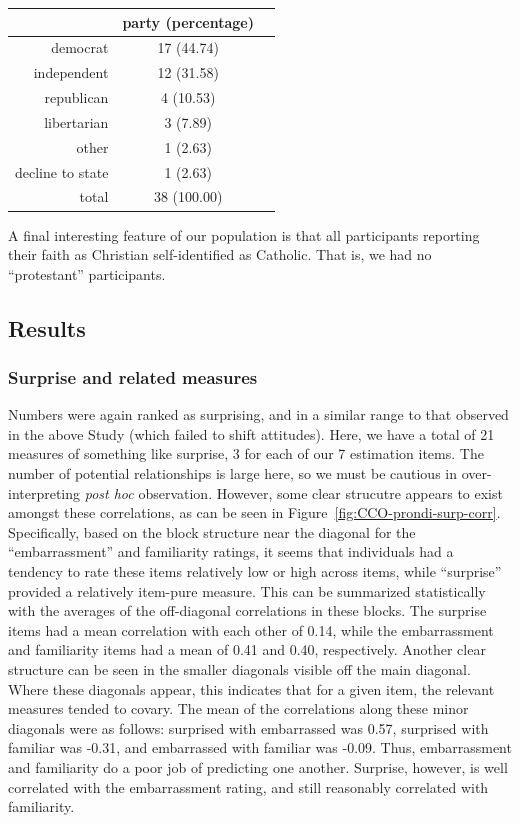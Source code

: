 \begin{table}[ht]
\centering
\begin{tabular}{rcc}
  \toprule
      & party (percentage) \\ 
  \midrule
  democrat &  17 (44.74) \\ 
  independent &  12 (31.58) \\ 
  republican &   4 (10.53) \\ 
  libertarian &   3 (7.89) \\ 
  other &   1 (2.63) \\ 
  decline to state &   1 (2.63) \\ 
  \midrule
  total &  38 (100.00) \\ 
   \bottomrule
\end{tabular}
\end{table}

A final interesting feature of our population is that all participants reporting
their faith as Christian self-identified as Catholic. That is, we had no
“protestant” participants.

\subsection{Results}

\subsubsection{Surprise and related measures}

Numbers were again ranked as surprising, and in a similar range to that observed
in the above Study (which failed to shift attitudes). Here, we have a total of
21 measures of something like surprise, 3 for each of our 7 estimation items.
The number of potential relationships is large here, so we must be cautious in
over-interpreting \emph{post hoc} observation. However, some clear strucutre
appears to exist amongst these correlations, as can be seen in
Figure~\ref{fig:CCO-prondi-surp-corr}. Specifically, based on the block
structure near the diagonal for the “embarrassment” and familiarity ratings, it
seems that individuals had a tendency to rate these items relatively low or high
across items, while “surprise” provided a relatively item-pure measure. This can
be summarized statistically with the averages of the off-diagonal correlations
in these blocks. The surprise items had a mean correlation with each other of
0.14, while the embarrassment and familiarity items had a mean of 0.41 and 0.40,
respectively. Another clear structure can be seen in the smaller diagonals
visible off the main diagonal. Where these diagonals appear, this indicates that
for a given item, the relevant measures tended to covary. The mean of the
correlations along these minor diagonals were as follows: surprised with
embarrassed was 0.57, surprised with familiar was -0.31, and embarrassed with
familiar was -0.09. Thus, embarrassment and familiarity do a poor job of
predicting one another. Surprise, however, is well correlated with the
embarrassment rating, and still reasonably correlated with familiarity.

